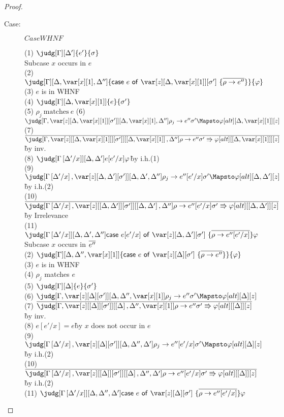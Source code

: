 \begin{proof}
\begin{description}
\item[Case:] $CaseWHNF$
\begin{tabbing}
    (1) $\judg[\G][\D']{e'}{\s}$\\
    Subcase $x$ occurs in $e$\\
    (2) $\judg[\G][\D,\xl,\D'']{\ccase{e}{\z[\D,\xl][\s']~\{\ov{\rho\to e''}\}}}{\vp}$\\
    (3) $e$ is in WHNF\\
    (4) $\judg[\G][\D,\xl]{e}{\s'}$\\
    (5) $\rho_j~\textrm{matches}~e$
    (6) $\judg[\G,\zr{\D,\xl}{\s'}][\D,\xl,\D'']{\rho_j \to e''}{\s' \Mapsto \vp}[alt][\D,\xl][z]$\\
    (7) $\ov{\judg[\G,\zr{\irr{\D,\xl}}{\s'}][\irr{\D,\xl},\D'']{\rho\to e''}{\s' \Rrightarrow \vp}[alt][\irr{\D,\xl}][z]}$\`by inv.\\
    (8) $\judg[\subst{\G}{\D'}{x}][\D,\D']{e[e'/x]}{\vp}$\`by i.h.(1)\\
    (9) $\judg[\subst{\G}{\D'}{x},\zr{\D,\D'}{\s'}][\D,\D',\D'']{\rho_j \to e''[e'/x]}{\s' \Mapsto \vp}[alt][\D,\D'][z]$\` by i.h.(2)\\
    (10) $\ov{\judg[\subst{\G}{\D'}{x},\zr{\irr{\D,\D'}}{\s'}][\irr{\D,\D'},\D'']{\rho\to e''[e'/x]}{\s' \Rrightarrow \vp}[alt][\irr{\D,\D'}][z]}$ \` by Irrelevance\\
    (11) $\judg[\subst{\G}{\D'}{x}][\D,\D',\D'']{\ccase{e[e'/x]}{\z[\D,\D'][\s']~\{\ov{\rho\to e''[e'/x]}\}}}{\vp}$\\
    Subcase $x$ occurs in $\overline{e''}$\\
    (2) $\judg[\G][\D,\D'',\xl]{\ccase{e}{\z[\D][\s']~\{\ov{\rho\to e''}\}}}{\vp}$\\
    (3) $e$ is in WHNF\\
    (4) $\rho_j$ matches $e$\\
    (5) $\judg[\G][\D]{e}{\s'}$\\
    (6) $\judg[\G,\zr{\D}{\s'}][\D,\D'',\xl]{\rho_j \to e''}{\s' \Mapsto \vp}[alt][\D][z]$\\
    (7) $\ov{\judg[\G,\zr{\irr{\D}}{\s'}][\irr{\D},\D'',\xl]{\rho\to e''}{\s' \Rrightarrow \vp}[alt][\irr{\D}][z]}$\`by inv.\\
    (8) $e[e'/x] = e$\` by $x$ does not occur in $e$\\
    (9) $\judg[\subst{\G}{\D'}{x},\zr{\D}{\s'}][\D,\D'',\D']{\rho_j \to e''[e'/x]}{\s' \Mapsto \vp}[alt][\D][z]$\`by i.h.(2)\\
    (10) $\ov{\judg[\subst{\G}{\D'}{x},\zr{\irr{\D}}{\s'}][\irr{\D},\D'',\D']{\rho\to e''[e'/x]}{\s' \Rrightarrow \vp}[alt][\irr{\D}][z]}$\`by i.h.(2)\\
    (11) $\judg[\subst{\G}{\D'}{x}][\D,\D'',\D']{\ccase{e}{\z[\D][\s']~\{\ov{\rho\to e''[e'/x]}\}}}{\vp}$\\
\end{tabbing}


\end{description}
\end{proof}
